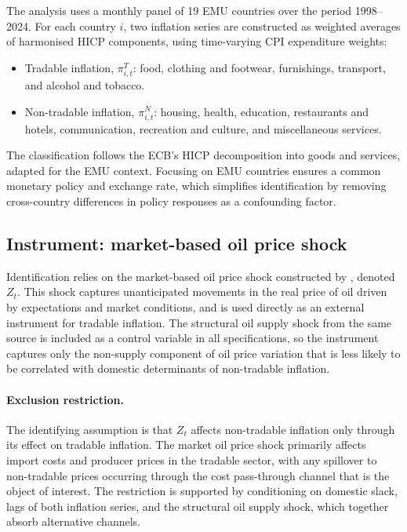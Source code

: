 \documentclass[11pt]{article}
\begin{document}
The analysis uses a monthly panel of 19 EMU countries over the period 1998--2024. For each country $i$, two inflation series are constructed as weighted averages of harmonised HICP components, using time-varying CPI expenditure weights:
\begin{itemize}
  \item Tradable inflation, $\pi^T_{i,t}$: food, clothing and footwear, furnishings, transport, and alcohol and tobacco.
  \item Non-tradable inflation, $\pi^N_{i,t}$: housing, health, education, restaurants and hotels, communication, recreation and culture, and miscellaneous services.
\end{itemize}
The classification follows the ECB's HICP decomposition into goods and services, adapted for the EMU context. Focusing on EMU countries ensures a common monetary policy and exchange rate, which simplifies identification by removing cross-country differences in policy responses as a confounding factor.

\subsection{Instrument: market-based oil price shock}

Identification relies on the market-based oil price shock constructed by \citet{baumeister2019structural}, denoted $Z_t$. This shock captures unanticipated movements in the real price of oil driven by expectations and market conditions, and is used directly as an external instrument for tradable inflation. The structural oil supply shock from the same source is included as a control variable in all specifications, so the instrument captures only the non-supply component of oil price variation that is less likely to be correlated with domestic determinants of non-tradable inflation.

\paragraph{Exclusion restriction.} The identifying assumption is that $Z_t$ affects non-tradable inflation only through its effect on tradable inflation. The market oil price shock primarily affects import costs and producer prices in the tradable sector, with any spillover to non-tradable prices occurring through the cost pass-through channel that is the object of interest. The restriction is supported by conditioning on domestic slack, lags of both inflation series, and the structural oil supply shock, which together absorb alternative channels.
\end{document}

